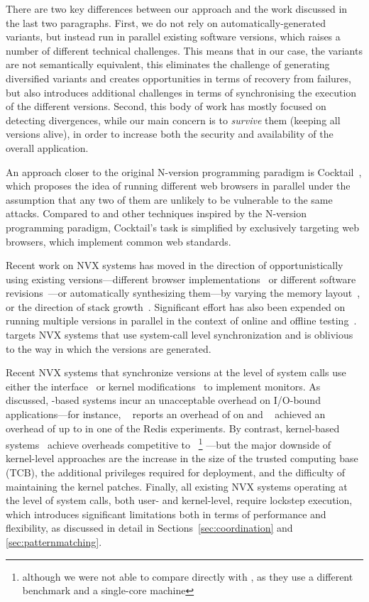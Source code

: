 There are two key differences between our approach and the work
discussed in the last two paragraphs.  First, we do not rely on
automatically-generated variants, but instead run in parallel existing
software versions, which raises a number of different technical
challenges.  
This means that in our case, the variants are not
semantically equivalent, this eliminates the challenge of generating
diversified variants and creates opportunities in terms of recovery
from failures, but also introduces additional challenges in terms of
synchronising the execution of the different versions.  
Second, this body of work has mostly focused on detecting divergences,
while our main concern is to \textit{survive} them (keeping all
versions alive), in order to increase both the security and
availability of the overall application.

An approach closer to the original N-version programming paradigm is
Cocktail~\cite{cocktail}, which proposes the idea of running different
web browsers in parallel under the assumption that any two of them are
unlikely to be vulnerable to the same attacks.  Compared to \mx and
other techniques inspired by the N-version programming paradigm,
Cocktail's task is simplified by exclusively targeting web browsers,
which implement common web standards.

Recent work on NVX systems has moved in the direction of
opportunistically using existing versions---\eg different browser
implementations~\cite{cocktail} or different software
revisions~\cite{mx}---or automatically synthesizing them---\eg by
varying the memory layout~\cite{cox2006,diehard06}, or the direction
of stack growth~\cite{orchestra09}.  Significant effort has also been
expended on running multiple versions in parallel in the context of
online and offline
testing~\cite{back-to-back90,onlinevalidation,bandaid-patch07,tachyon12}.
\nx targets NVX systems that use
system-call level synchronization and is oblivious to the way in which
the versions are generated.

Recent NVX systems that synchronize versions at the level of system
calls use either the \ptrace interface~\cite{orchestra09,tachyon12,mx}
or kernel modifications~\cite{cox2006} to implement monitors.  As
discussed, -based systems incur an unacceptable overhead
on I/O-bound applications---for instance, \tachyon~\cite{tachyon12}
reports an overhead of \tachyonLighttpd on \lighttpd and \mx~\cite{mx}
achieved an overhead of up to \mxRedis in one of the Redis
experiments.  By contrast, kernel-based systems~\cite{cox2006} achieve
overheads competitive to \varan~\footnote{although we were not able to compare
directly with \cite{cox2006}, as they use a different benchmark and a
single-core machine} ---but the major downside of kernel-level approaches are
the increase in the size of the trusted computing base (TCB), the additional
privileges required for deployment, and the difficulty of maintaining the
kernel patches.  Finally, all existing NVX systems operating at the level of
system calls, both user- and kernel-level, require lockstep execution, which
introduces significant limitations both in terms of performance and
flexibility, as discussed in detail in Sections~\ref{sec:coordination} and
\ref{sec:patternmatching}.

